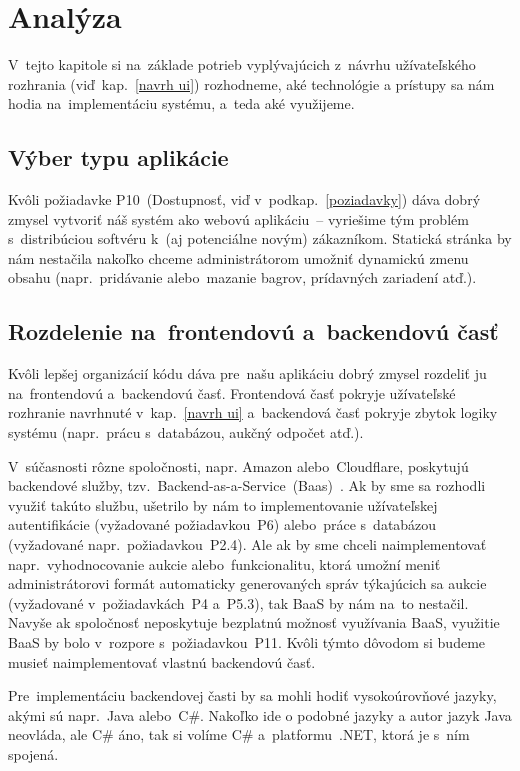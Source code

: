 \chapter{Analýza}

V~tejto kapitole si na~základe potrieb vyplývajúcich z~návrhu užívateľského rozhrania (viď~kap.~\ref{navrh ui}) rozhodneme, aké technológie a prístupy sa nám hodia na~implementáciu systému, a~teda aké využijeme.

\section{Výber typu aplikácie}

Kvôli požiadavke P10~(Dostupnosť, viď v~podkap.~\ref{poziadavky}) dáva dobrý zmysel vytvoriť náš systém ako webovú aplikáciu~-- vyriešime tým problém s~distribúciou softvéru k~(aj potenciálne novým) zákazníkom. Statická stránka by nám nestačila nakoľko chceme administrátorom umožniť dynamickú zmenu obsahu (napr.~pridávanie alebo~mazanie bagrov, prídavných zariadení atď.).

\section{Rozdelenie na~frontendovú a~backendovú časť}
\label{rozdelenie na frontendovu a backendovu cast}

Kvôli lepšej organizácií kódu dáva pre~našu aplikáciu dobrý zmysel rozdeliť ju na~frontendovú a~backendovú časť. Frontendová časť pokryje užívateľské rozhranie navrhnuté v~kap.~\ref{navrh ui} a~backendová časť pokryje zbytok logiky systému (napr.~prácu s~databázou, aukčný odpočet atď.).

V~súčasnosti rôzne spoločnosti, napr. Amazon alebo~Cloudflare, poskytujú backendové služby, tzv.~Backend-as-a-Service~(Baas)~\cite{baas}. Ak by sme sa rozhodli využiť takúto službu, ušetrilo by nám to implementovanie užívateľskej autentifikácie (vyžadované požiadavkou~P6) alebo~práce s~databázou (vyžadované napr.~požiadavkou~P2.4). Ale ak by sme chceli naimplementovať napr.~vyhodnocovanie aukcie alebo~funkcionalitu, ktorá umožní meniť administrátorovi formát automaticky generovaných správ týkajúcich sa aukcie (vyžadované v~požiadavkách~P4 a~P5.3), tak BaaS by nám na~to nestačil. Navyše ak spoločnosť neposkytuje bezplatnú možnosť využívania BaaS, využitie BaaS by bolo v~rozpore s~požiadavkou~P11. Kvôli týmto dôvodom si budeme musieť naimplementovať vlastnú backendovú časť.

Pre~implementáciu backendovej časti by sa mohli hodiť vysokoúrovňové jazyky, akými sú napr.~Java alebo~C\#. Nakoľko ide o podobné jazyky a autor jazyk Java neovláda, ale C\# áno, tak si volíme C\# a~platformu~.NET, ktorá je s~ním spojená.


